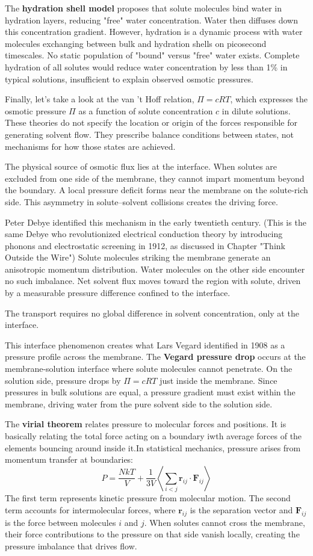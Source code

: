 The \textbf{hydration shell model} proposes that solute molecules bind water in hydration layers, reducing "free" water concentration. Water then diffuses down this concentration gradient. However, hydration is a dynamic process with water molecules exchanging between bulk and hydration shells on picosecond timescales. No static population of "bound" versus "free" water exists. Complete hydration of all solutes would reduce water concentration by less than 1\% in typical solutions, insufficient to explain observed osmotic pressures.

Finally, let's take a look at the van 't Hoff relation, $\Pi = cRT$, which expresses the osmotic pressure $\Pi$ as a function of solute concentration $c$ in dilute solutions. These theories do not specify the location or origin of the forces responsible for generating solvent flow. They prescribe balance conditions between states, not mechanisms for how those states are achieved.

The physical source of osmotic flux lies at the interface. When solutes are excluded from one side of the membrane, they cannot impart momentum beyond the boundary. A local pressure deficit forms near the membrane on the solute-rich side. This asymmetry in solute–solvent collisions creates the driving force.

Peter Debye identified this mechanism in the early twentieth century. (This is the same Debye who revolutionized electrical conduction theory by introducing phonons and electrostatic screening in 1912, as discussed in Chapter "Think Outside the Wire") Solute molecules striking the membrane generate an anisotropic momentum distribution. Water molecules on the other side encounter no such imbalance. Net solvent flux moves toward the region with solute, driven by a measurable pressure difference confined to the interface.

The transport requires no global difference in solvent concentration, only at the interface.

This interface phenomenon creates what Lars Vegard identified in 1908 as a pressure profile across the membrane. The \textbf{Vegard pressure drop} occurs at the membrane-solution interface where solute molecules cannot penetrate. On the solution side, pressure drops by $\Pi = cRT$ just inside the membrane. Since pressures in bulk solutions are equal, a pressure gradient must exist within the membrane, driving water from the pure solvent side to the solution side.

The \textbf{virial theorem} relates pressure to molecular forces and positions. It is basically relating the total force acting on a boundary iwth average forces of the elements bouncing around inside it.In statistical mechanics, pressure arises from momentum transfer at boundaries:
\[
P = \frac{NkT}{V} + \frac{1}{3V}\left\langle \sum_{i<j} \mathbf{r}_{ij} \cdot \mathbf{F}_{ij} \right\rangle
\]
The first term represents kinetic pressure from molecular motion. The second term accounts for intermolecular forces, where $\mathbf{r}_{ij}$ is the separation vector and $\mathbf{F}_{ij}$ is the force between molecules $i$ and $j$. When solutes cannot cross the membrane, their force contributions to the pressure on that side vanish locally, creating the pressure imbalance that drives flow.


